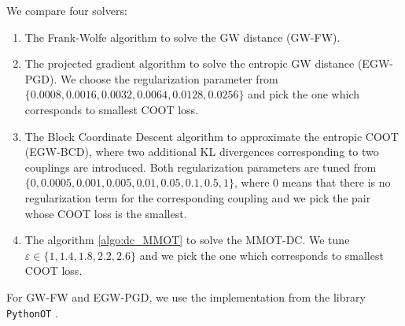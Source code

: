 We compare four solvers:
\begin{enumerate}
  \item The Frank-Wolfe algorithm to solve the GW distance (GW-FW).

  \item The projected gradient algorithm to solve the entropic GW distance \citep{Peyre16} (EGW-PGD). We choose the regularization
  parameter from $\{0.0008, 0.0016, 0.0032, 0.0064, 0.0128, 0.0256 \}$ and pick the one which corresponds to smallest COOT loss.

  \item The Block Coordinate Descent algorithm to approximate the entropic COOT \citep{Redko20}
  (EGW-BCD), where two additional KL divergences corresponding to two couplings are introduced.
  Both regularization parameters are tuned from $\{0, 0.0005, 0.001, 0.005, 0.01, 0.05, 0.1, 0.5, 1 \}$,
  where $0$ means that there is no regularization term for the corresponding coupling and we pick the pair whose COOT loss is the smallest.

  \item The algorithm \ref{algo:dc_MMOT} to solve the MMOT-DC. We tune
  $\varepsilon \in \{1, 1.4, 1.8, 2.2, 2.6\}$ and we pick the one which corresponds to smallest COOT loss.
\end{enumerate}
For GW-FW and EGW-PGD, we use the implementation from the library \texttt{PythonOT} \citep{Flamary21}.

